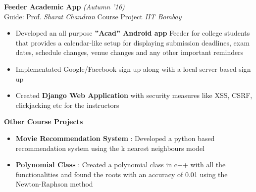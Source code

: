 \documentclass{article}
\newcommand{\xfilll}[2][1ex]{
\dimen0=#2\advance\dimen0 by #1
\leaders\hrule height \dimen0 depth -#1\hfill}
\begin{document}
\pagebreak
\textbf {Feeder Academic App} \hfill{\sl \small (Autumn '16)}\\
Guide: Prof. \textit{Sharat Chandran }\textbar Course Project \hfill{\sl \small IIT Bombay}\\
\vspace{-17pt}
\begin{itemize}[itemsep = -0.75 mm, leftmargin=*]
\item Developed an all purpose \textbf{”Acad” Android app} Feeder for college students that provides a calendar-like setup for displaying submission deadlines, exam dates, schedule changes, venue changes and any other important reminders
\item Implementated  Google/Facebook sign up along with a local server based sign up 
\item Created \textbf{Django Web Application} with security measures like XSS, CSRF, clickjacking etc for the instructors
\end{itemize}
\textbf {Other Course Projects}\\
\vspace{-17pt}
\begin{itemize}[itemsep = -0.75 mm, leftmargin=*]
\item \textbf{Movie Recommendation System} : Developed a python based recommendation system using the k nearest neighbours model
\item \textbf{Polynomial Class} : Created a polynomial class in c++ with all the functionalities and found the roots with an accuracy of 0.01 using the Newton-Raphson method
\end{itemize}
\vspace{-10pt}

\end{document}
